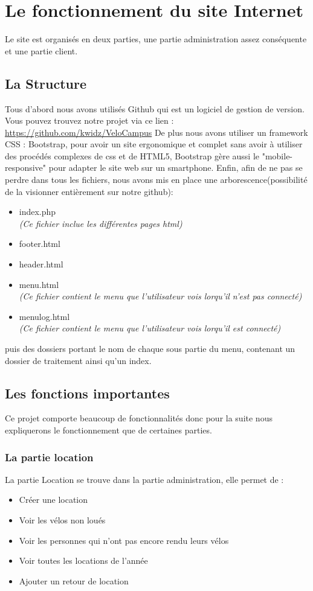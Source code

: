 \documentclass[11pt,a4paper,titlepage]{report}
\begin{document}
\chapter{Le fonctionnement du site Internet}
Le site est organisés en deux parties, une partie administration assez conséquente et une partie client.
\section{La Structure}
Tous d'abord nous avons utilisés Github qui est un logiciel de gestion de version.
Vous pouvez trouvez notre projet via ce lien :
\url{https://github.com/kwidz/VeloCampus}
De plus nous avons utiliser un framework CSS : Bootstrap, pour avoir un site ergonomique et complet sans avoir à utiliser des procédés complexes de css et de HTML5, Bootstrap gère aussi le "mobile-responsive" pour adapter le site web sur un smartphone.
Enfin, afin de ne pas se perdre dans tous les fichiers, nous avons mis en place une arborescence(possibilité de la visionner entièrement sur notre github):
\begin{itemize}
\item index.php \\
\textit{(Ce fichier inclue les différentes pages html)}
\item footer.html
\item header.html
\item menu.html \\
\textit{(Ce fichier contient le menu que l'utilisateur vois lorqu'il n'est pas connecté)}
\item menulog.html \\
\textit{(Ce fichier contient le menu que l'utilisateur vois lorqu'il est connecté)}
\end{itemize}
 puis des dossiers portant le nom de chaque sous partie du menu, contenant un dossier de traitement ainsi qu'un index.
 
\section{Les fonctions importantes}
Ce projet comporte beaucoup de fonctionnalités donc pour la suite nous expliquerons le fonctionnement que de certaines parties.  
\subsection{La partie location}
La partie Location se trouve dans la partie administration, elle permet de : 
\begin{itemize}
\item Créer une location
\item Voir les vélos non loués
\item Voir les personnes qui n'ont pas encore rendu leurs vélos
\item Voir toutes les locations de l'année
\item Ajouter un retour de location 
\end{itemize}
\end{document}
